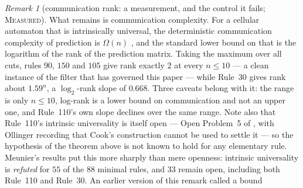 \documentclass[11pt]{article}
\theoremstyle{definition}
\theoremstyle{remark}
\newtheorem{remark}[theorem]{Remark}
\newcommand{\MEASURED}{\textsc{Measured}}
\begin{document}
\begin{remark}[communication rank: a measurement, and the control it fails; \MEASURED]\label{p3:rank}
What remains is communication complexity. For a cellular automaton that is intrinsically universal, the
deterministic communication complexity of prediction is $\Omega(n)$ \cite[Thm.~3.1]{Meunier}, and the
standard lower bound on that is the logarithm of the rank of the prediction matrix. Taking the maximum
over all cuts, rules $90$, $150$ and $105$ give rank exactly $2$ at every $n\le10$ --- a clean instance
of the filter that has governed this paper --- while Rule~30 gives rank about $1.59^{n}$, a
$\log_2$-rank slope of $0.668$. Three caveats belong with it: the range is only $n\le10$, log-rank is a
lower bound on communication and not an upper one, and Rule~110's own slope declines over the same
range. Note also that Rule~110's intrinsic universality is itself open --- Open Problem~5 of \cite{KariSurvey}, with Ollinger recording that Cook's construction cannot be used to settle it --- so the hypothesis of the theorem above is not known to hold for any elementary rule. Meunier's results put this more sharply than mere openness: intrinsic universality is \emph{refuted} for $55$ of the $88$ minimal rules, and $33$ remain open, including both Rule~110 and Rule~30. An earlier version of this remark called a bound

\end{remark}
\end{document}
